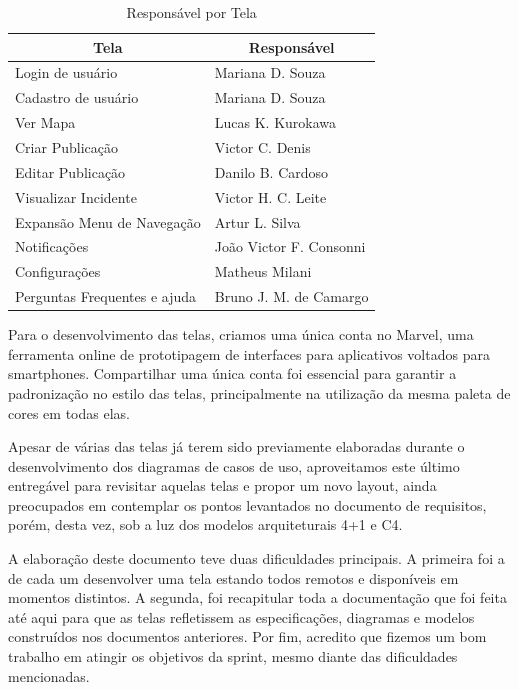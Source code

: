 \documentclass[12pt]{article}
\begin{document}
\begin{table}[h!]
\centering
\begin{tabular}{|l|l|}
\hline
\multicolumn{1}{|c|}{\textbf{Tela}} & \multicolumn{1}{c|}{\textbf{Responsável}} \\ \hline
Login de usuário & Mariana D. Souza \\ \hline
Cadastro de usuário & Mariana D. Souza \\ \hline
Ver Mapa & Lucas K. Kurokawa \\ \hline
Criar Publicação & Victor C. Denis \\ \hline
Editar Publicação & Danilo B. Cardoso \\ \hline
Visualizar Incidente & Victor H. C. Leite \\ \hline
Expansão Menu de Navegação & Artur L. Silva \\ \hline
Notificações & João Victor F. Consonni \\ \hline
Configurações & Matheus Milani \\ \hline
Perguntas Frequentes e ajuda & Bruno J. M. de Camargo \\ \hline
\end{tabular}
\caption{Responsável por Tela}
\label{tabela}
\end{table}

Para o desenvolvimento das telas, criamos uma única conta no Marvel, uma ferramenta online de prototipagem de interfaces para aplicativos voltados para smartphones. Compartilhar uma única conta foi essencial para garantir a padronização no estilo das telas, principalmente na utilização da mesma paleta de cores em todas elas.

Apesar de várias das telas já terem sido previamente elaboradas durante o desenvolvimento dos diagramas de casos de uso, aproveitamos este último entregável para revisitar aquelas telas e propor um novo layout, ainda preocupados em contemplar os pontos levantados no documento de requisitos, porém, desta vez, sob a luz dos modelos arquiteturais 4+1 e C4.



A elaboração deste documento teve duas dificuldades principais. A primeira foi a de cada um desenvolver uma tela estando todos remotos e disponíveis em momentos distintos. A segunda, foi recapitular toda a documentação que foi feita até aqui para que as telas refletissem as especificações, diagramas e modelos construídos nos documentos anteriores. Por fim, acredito que fizemos um bom trabalho em atingir os objetivos da sprint, mesmo diante das dificuldades mencionadas. 



\end{document}
